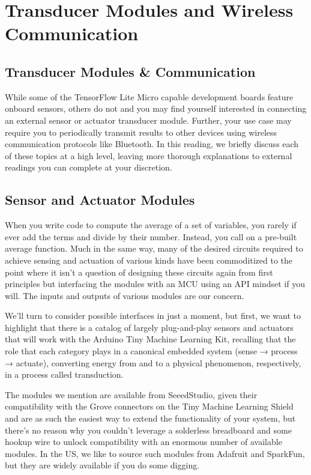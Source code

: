 \section{Transducer Modules and Wireless Communication}

\subsection{Transducer Modules \& Communication}

    While some of the TensorFlow Lite Micro capable development boards feature onboard sensors, others do not and you may find yourself interested in connecting an external sensor or actuator transducer module. Further, your use case may require you to periodically transmit results to other devices using wireless communication protocols like Bluetooth. In this reading, we briefly discuss each of these topics at a high level, leaving more thorough explanations to external readings you can complete at your discretion.
    
\subsection{Sensor and Actuator Modules}

    When you write code to compute the average of a set of variables, you rarely if ever add the terms and divide by their number. Instead, you call on a pre-built average function. Much in the same way, many of the desired circuits required to achieve sensing and actuation of various kinds have been commoditized to the point where it isn’t a question of designing these circuits again from first principles but interfacing the modules with an MCU using an API mindset if you will. The inputs and outputs of various modules are our concern.
    
    We’ll turn to consider possible interfaces in just a moment, but first, we want to highlight that there is a catalog of largely plug-and-play sensors and actuators that will work with the Arduino Tiny Machine Learning Kit, recalling that the role that each category plays in a canonical embedded system (sense → process → actuate), converting energy from and to a physical phenomenon, respectively, in a process called transduction.
    
    The modules we mention are available from SeeedStudio, given their compatibility with the Grove connectors on the Tiny Machine Learning Shield and are as such the easiest way to extend the functionality of your system, but there’s no reason why you couldn’t leverage a solderless breadboard and some hookup wire to unlock compatibility with an enormous number of available modules. In the US, we like to source such modules from Adafruit and SparkFun, but they are widely available if you do some digging.
    
